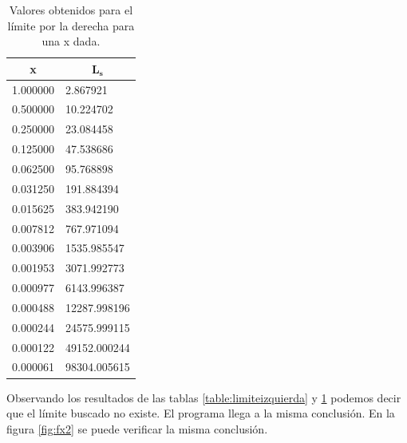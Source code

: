 \begin{minipage}{0.45\linewidth}
    \begin{table}[H]
        \centering
        \begin{tabular}{ll}
            \hline
            \multicolumn{1}{c}{\textbf{x}} & \multicolumn{1}{c}{$\mathbf{L_s}$} \\ \hline
            1.000000                       & 2.867921                           \\
            0.500000                       & 10.224702                          \\
            0.250000                       & 23.084458                          \\
            0.125000                       & 47.538686                          \\
            0.062500                       & 95.768898                          \\
            0.031250                       & 191.884394                         \\
            0.015625                       & 383.942190                         \\
            0.007812                       & 767.971094                         \\
            0.003906                       & 1535.985547                        \\
            0.001953                       & 3071.992773                        \\
            0.000977                       & 6143.996387                        \\
            0.000488                       & 12287.998196                       \\
            0.000244                       & 24575.999115                       \\
            0.000122                       & 49152.000244                       \\
            0.000061                       & 98304.005615                       \\ \hline
        \end{tabular}
        \caption{Valores obtenidos para el límite por la derecha para una x dada.}
        \label{table:limitederecha}
    \end{table}
\end{minipage}

Observando los resultados de las tablas \ref{table:limiteizquierda} y \ref{table:limitederecha} podemos decir que el límite buscado no existe. El programa llega a la misma conclusión. En la figura \ref{fig:fx2} se puede verificar la misma conclusión.